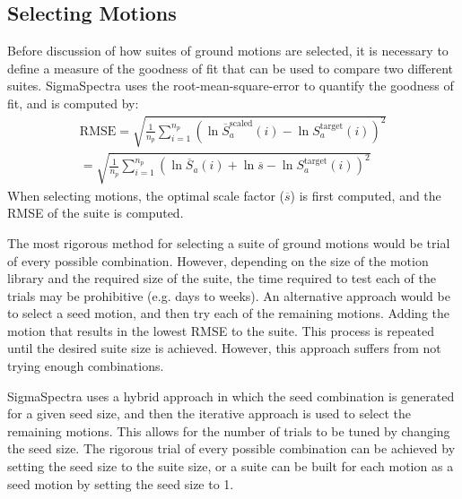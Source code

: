 \documentclass[11pt]{article}
\begin{document}
\subsection{Selecting Motions}\label{sec:method:selecting}
Before discussion of how suites of ground motions are selected, it is necessary
to define a measure of the goodness of fit that can be used to compare two
different suites. SigmaSpectra uses the root-mean-square-error to quantify the
goodness of fit, and is computed by:
\begin{multline*}
	\text{RMSE} = \sqrt{\frac{1}{n_p} \sum_{i=1}^{n_p}\left( \ln
	\overline{S}_a^\text{scaled}(i) - \ln S_a^\text{target}(i)\right)^2 } \\ =
	\sqrt{\frac{1}{n_p} \sum_{i=1}^{n_p}\left( \ln \overline{S}_a(i) + \ln
	\overline{s} - \ln S_a^\text{target}(i)\right)^2 } 
\end{multline*}
When selecting motions, the optimal scale factor ($\overline{s}$) is first
computed, and the RMSE of the suite is computed.

The most rigorous method for selecting a suite of ground motions would be trial
of every possible combination. However, depending on the size of the motion
library and the required size of the suite, the time required to test each of
the trials may be prohibitive (e.g. days to weeks). An alternative approach
would be to select a seed motion, and then try each of the remaining motions.
Adding the motion  that results in the lowest RMSE to the suite. This process
is repeated until the desired suite size is achieved. However, this approach
suffers from not trying enough combinations.

SigmaSpectra uses a hybrid approach in which the seed combination is generated
for a given seed size, and then the iterative approach is used to select the
remaining motions. This allows for the number of trials to be tuned by changing
the seed size. The rigorous trial of every possible combination can be achieved
by setting the seed size to the suite size, or a suite can be built for each
motion as a seed motion by setting the seed size to 1.
\end{document}
